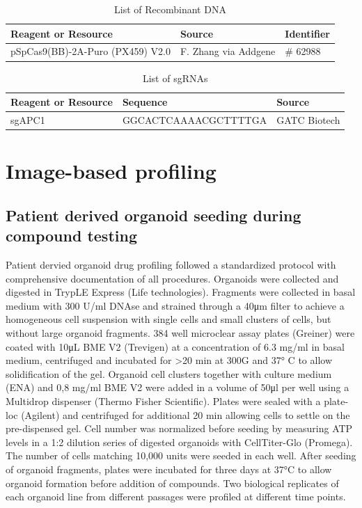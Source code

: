 \begin{flushleft}
\begin{table}[htb]
\caption{List of Recombinant DNA}
\label{tab:recombinant_dna} %
\begin{tabularx}{\textwidth}{Xll}
\toprule
\textbf{Reagent or Resource} & \textbf{Source} & \textbf{Identifier} \\
\midrule
pSpCas9(BB)-2A-Puro (PX459) V2.0 & F. Zhang via Addgene & \# 62988 \\
\bottomrule
\end{tabularx}
\end{table}

\begin{table}[htb]
\caption{List of sgRNAs}
\label{tab:sgrna} %
\begin{tabularx}{\textwidth}{XlX}
\toprule
\textbf{Reagent or Resource} & \textbf{Sequence} & \textbf{Source} \\
\midrule
sgAPC1 & GGCACTCAAAACGCTTTTGA & GATC Biotech \\
\bottomrule
\end{tabularx}
\end{table}


\section{Image-based profiling}

\subsection{Patient derived organoid seeding during compound testing}
Patient dervied organoid drug profiling followed a standardized protocol with comprehensive documentation of all procedures. Organoids were collected and digested in TrypLE Express (Life technologies). Fragments were collected in basal medium with 300 U/ml DNAse and strained through a 40μm filter to achieve a homogeneous cell suspension with single cells and small clusters of cells, but without large organoid fragments. 384 well microclear assay plates (Greiner) were coated with 10μL BME V2 (Trevigen) at a concentration of 6.3 mg/ml in basal medium, centrifuged and incubated for >20 min at 300G and 37° C to allow solidification of the gel. Organoid cell clusters together with culture medium (ENA) and 0,8 mg/ml BME V2 were added in a volume of 50μl per well using a Multidrop dispenser (Thermo Fisher Scientific). Plates were sealed with a plate-loc (Agilent) and centrifuged for additional 20 min allowing cells to settle on the pre-dispensed gel. Cell number was normalized before seeding by measuring ATP levels in a 1:2 dilution series of digested organoids with CellTiter-Glo (Promega). The number of cells matching 10,000 units were seeded in each well. After seeding of organoid fragments, plates were incubated for three days at 37°C to allow organoid formation before addition of compounds. Two biological replicates of each organoid line from different passages were profiled at different time points.


\end{flushleft}

